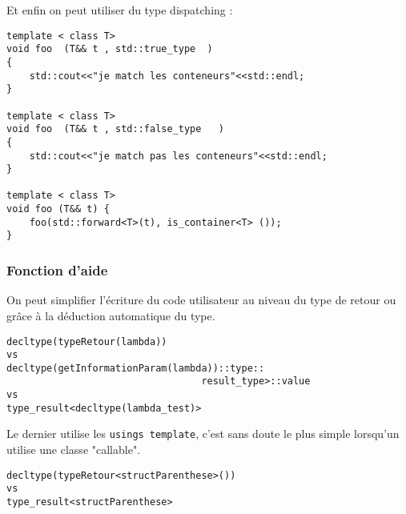 \documentclass{beamer}
\begin{document}
\begin{frame}[containsverbatim]
Et enfin on peut utiliser du type dispatching :
	\begin{lstlisting}
template < class T>
void foo  (T&& t , std::true_type  )
{
    std::cout<<"je match les conteneurs"<<std::endl;
}

template < class T>
void foo  (T&& t , std::false_type   )
{
    std::cout<<"je match pas les conteneurs"<<std::endl;
}

template < class T>
void foo (T&& t) {
    foo(std::forward<T>(t), is_container<T> ()); 
}
	\end{lstlisting}

\end{frame}

\begin{frame}[containsverbatim]
	\frametitle{Fonction d'aide}
	On peut simplifier l’écriture du code utilisateur au niveau du type de retour ou grâce à la déduction automatique du type.
	\begin{lstlisting}
decltype(typeRetour(lambda))
vs
decltype(getInformationParam(lambda))::type::
                                  result_type>::value
vs
type_result<decltype(lambda_test)> 
	\end{lstlisting}
Le dernier utilise les \texttt{usings template}, c'est sans doute le plus simple lorsqu'un utilise une classe "callable".
	\begin{lstlisting}
decltype(typeRetour<structParenthese>())
vs
type_result<structParenthese>  
	\end{lstlisting}

\end{frame}
\end{document}
